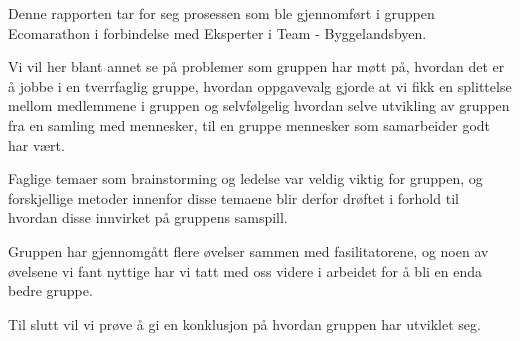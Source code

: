 Denne rapporten tar for seg prosessen som ble gjennomført i gruppen Ecomarathon i forbindelse med Eksperter i Team - Byggelandsbyen.

Vi vil her blant annet se på problemer som gruppen har møtt på, hvordan det er å jobbe i en tverrfaglig gruppe, hvordan oppgavevalg gjorde at vi fikk en splittelse mellom medlemmene i gruppen og selvfølgelig hvordan selve utvikling av gruppen fra en samling med mennesker, til en gruppe mennesker som samarbeider godt har vært.

Faglige temaer som brainstorming og ledelse var veldig viktig for gruppen, og forskjellige metoder innenfor disse temaene blir derfor drøftet i forhold til hvordan disse innvirket på gruppens samspill.

Gruppen har gjennomgått flere øvelser sammen med fasilitatorene, og noen av øvelsene vi fant nyttige har vi tatt med oss videre i arbeidet for å bli en enda bedre gruppe.

Til slutt vil vi prøve å gi en konklusjon på hvordan gruppen har utviklet seg. 
